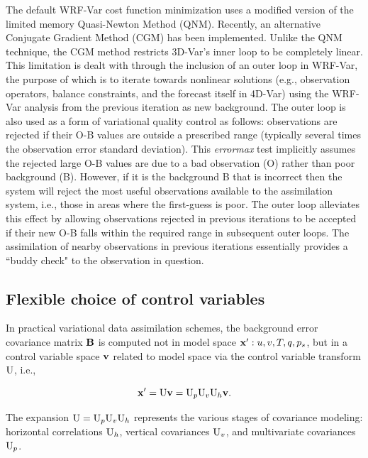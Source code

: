 The default WRF-Var cost function minimization uses a modified version of the limited 
memory Quasi-Newton Method (QNM). Recently, an alternative Conjugate Gradient 
Method (CGM) has been implemented. Unlike the QNM technique, the CGM method 
restricts 3D-Var's inner loop to be completely linear. This limitation is dealt with through 
the inclusion of an outer loop in WRF-Var, the purpose of which is to iterate towards 
nonlinear solutions (e.g., observation operators, balance constraints, and the forecast itself in 
4D-Var) using the WRF-Var analysis from the previous iteration as new background. The 
outer loop is also used as a form of variational quality control as follows: observations are 
rejected if their O-B values are outside a prescribed range (typically several times the 
observation error standard deviation). This {\it errormax} test implicitly assumes the rejected 
large O-B values are due to a bad observation (O) rather than poor background (B). 
However, if it is the background B that is incorrect then the system will reject the most 
useful observations available to the assimilation system, i.e., those in areas where the 
first-guess is poor. The outer loop alleviates this effect by allowing observations 
rejected in previous iterations to be accepted if their new O-B falls within the required range 
in subsequent outer loops. The assimilation of nearby observations in previous iterations 
essentially provides a ``buddy check" to the observation in question.
 
\subsection{Flexible choice of control variables}
\label{var-cvs}

In practical variational data assimilation schemes, the background error covariance 
matrix ${\bf B}$ is computed not in model space ${\bf x}': u, v, T, q, p_{s}$, but in a 
control variable space ${\bf v}$ related to model space via the control variable transform ${\rm U}$, 
i.e.,

\begin{equation}
{\bf x}' = {\rm U}{\bf v}= {\rm U}_{p} {\rm U}_{v} {\rm U}_{h}{\bf v}.
\label{var-cv}
\end{equation}

The expansion ${\rm U}={\rm U}_{p} 
{\rm U}_{v} {\rm U}_{h}$ represents the various stages of covariance modeling: horizontal correlations ${\rm U}_{h}$, vertical covariances ${\rm U}_{v}$, and multivariate covariances
${\rm U}_{p}$.

